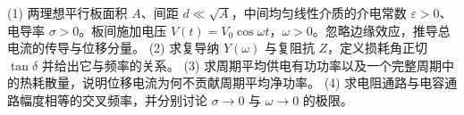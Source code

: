 (1) 两理想平行板面积 \(A\)、间距 \(d\ll\sqrt A\)，中间均匀线性介质的介电常数 \(\varepsilon>0\)、电导率 \(\sigma>0\)。板间施加电压 \(V(t)=V_0\cos\omega t\)，\(\omega>0\)。忽略边缘效应，推导总电流的传导与位移分量。
(2) 求复导纳 \(Y(\omega)\) 与复阻抗 \(Z\)，定义损耗角正切 \(\tan\delta\) 并给出它与频率的关系。
(3) 求周期平均供电有功功率以及一个完整周期中的热耗散量，说明位移电流为何不贡献周期平均净功率。
(4) 求电阻通路与电容通路幅度相等的交叉频率，并分别讨论 \(\sigma\to0\) 与 \(\omega\to0\) 的极限。
